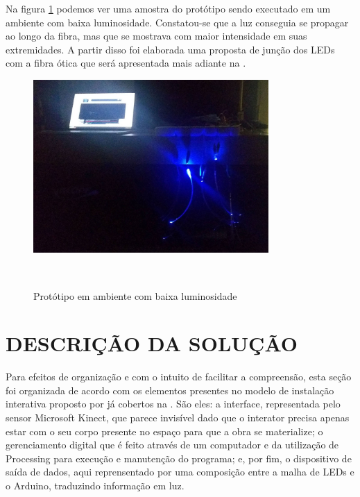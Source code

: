 Na figura \ref{fig:prototipo_escuro} podemos ver uma amostra do protótipo sendo executado em um ambiente com baixa luminosidade. Constatou-se que a luz conseguia se propagar ao longo da fibra, mas que se mostrava com maior intensidade em suas extremidades. A partir disso foi elaborada uma proposta de junção dos LEDs com a fibra ótica que será apresentada mais adiante na  .

\begin{figure}[H]
  \begin{center}
    \caption{Protótipo em ambiente com baixa luminosidade}
    \vspace*{0,2cm}
    \includegraphics[width=0.8\textwidth]{./04-figuras/prototipo_escuro}
    \label{fig:prototipo_escuro}
  \end{center}
  \vspace*{-0,9cm}
  \\
\end{figure}

\section{DESCRIÇÃO DA SOLUÇÃO}
\label{sec:solucao}

Para efeitos de organização e com o intuito de facilitar a compreensão, esta seção foi organizada de acordo com os elementos presentes no modelo de instalação interativa proposto por \cite{sogabe2011} já cobertos na . São eles: a interface, representada pelo sensor Microsoft Kinect, que parece invisível dado que o interator precisa apenas estar com o seu corpo presente no espaço para que a obra se materialize; o gerenciamento digital que é feito através de um computador e da utilização de Processing para execução e manutenção do programa; e, por fim, o dispositivo de saída de dados, aqui reprensentado por uma composição entre a malha de LEDs e o Arduino, traduzindo informação em luz.

